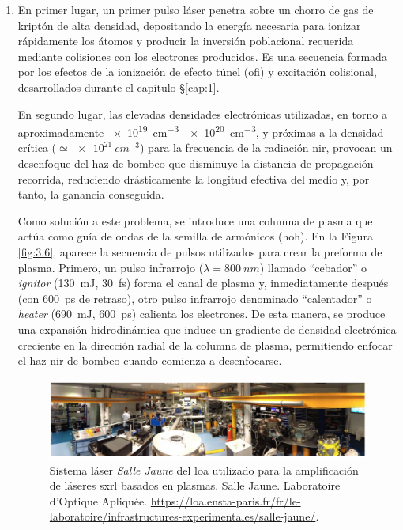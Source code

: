 \begin{enumerate}

    \item En primer lugar, un primer pulso láser penetra sobre un chorro de gas de kriptón de alta densidad, depositando la energía necesaria para ionizar rápidamente los átomos y producir la inversión poblacional requerida mediante colisiones con los electrones producidos. Es una secuencia formada por los efectos de la ionización de efecto túnel (\acrshort{ofi}) y excitación colisional, desarrollados durante el capítulo \S\ref{cap:1}.

      En segundo lugar, las elevadas densidades electrónicas utilizadas, en torno a aproximadamente \qtyrange{e19}{e20}{cm^{-3}}\autocite{Tuitje2020}, y próximas a la densidad crítica ($\simeq \qty{e21}{cm^{-3}}$) para la frecuencia de la radiación \acrshort{nir}, provocan un desenfoque del haz de bombeo que disminuye la distancia de propagación recorrida, reduciendo drásticamente la longitud efectiva del medio y, por tanto, la ganancia conseguida.

      Como solución a este problema, se introduce una columna de plasma que actúa como guía de ondas de la semilla de armónicos (\acrshort{hoh})\autocite{Depresseux2015}. En la Figura \ref{fig:3.6}, aparece la secuencia de pulsos utilizados para crear la preforma de plasma. Primero, un pulso infrarrojo ($\lambda = \qty{800}{nm}$) llamado \enquote{cebador} o \emph{ignitor} (\qty{130}{mJ}, \qty{30}{fs}) forma el canal de plasma y, inmediatamente después (con \qty{600}{ps} de retraso), otro pulso infrarrojo denominado \enquote{calentador} o \emph{heater} (\qty{690}{mJ}, \qty{600}{ps}) calienta los electrones. De esta manera, se produce una expansión hidrodinámica que induce un gradiente de densidad electrónica creciente en la dirección radial de la columna de plasma, permitiendo enfocar el haz \acrshort{nir} de bombeo cuando comienza a desenfocarse.

      \begin{figure}[htbp]
        \centering
        \includegraphics[width=\textwidth]{Figuras/ch3_sallejaune.png}
        \caption{Sistema láser \emph{Salle Jaune} del \acrshort{loa} utilizado para la amplificación de láseres \acrshort{sxrl} basados en plasmas. Salle Jaune. Laboratoire d'Optique Apliquée. \url{https://loa.ensta-paris.fr/fr/le-laboratoire/infrastructures-experimentales/salle-jaune/}.}
        \label{fig:3.5}
      \end{figure}


\end{enumerate}
